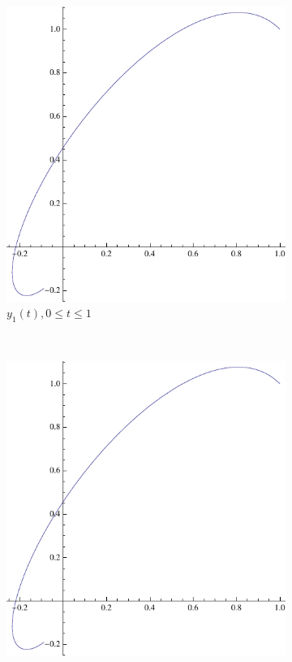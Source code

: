 \documentclass[11pt]{article}
\begin{document}
\begin{figure}
        \centering
        \begin{subfigure}[b]{0.45\textwidth}
                \centering
                \includegraphics[width=\textwidth]{curve}
                \caption{$y_1(t), 0 \leq t \leq 1$}
        \end{subfigure}%
        ~ %
        \begin{subfigure}[b]{0.45\textwidth}
                \centering
                \includegraphics[width=\textwidth]{curve}

\end{subfigure}
\end{figure}
\end{document}
